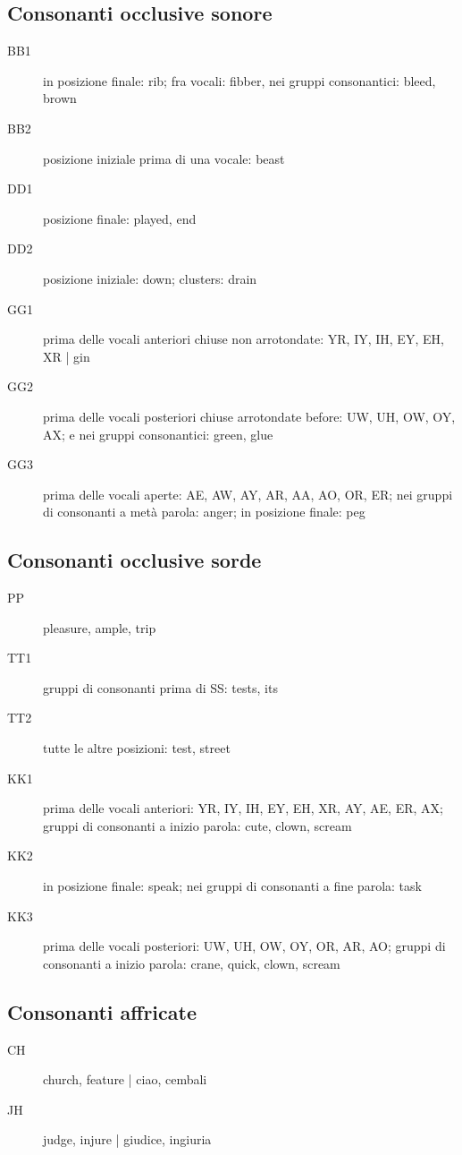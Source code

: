 \subsection{Consonanti occlusive sonore}
\begin{description}
\item[BB1] in posizione finale: rib; fra vocali: fibber, nei gruppi consonantici: bleed, brown
\item[BB2] posizione iniziale prima di una vocale: beast
\item[DD1] posizione finale: played, end
\item[DD2] posizione iniziale: down; clusters: drain
\item[GG1] prima delle vocali anteriori chiuse non arrotondate: YR, IY, IH, EY, EH, XR | gin
\item[GG2] prima delle vocali posteriori chiuse arrotondate before: UW, UH, OW, OY, AX; e nei gruppi consonantici: green, glue
\item[GG3] prima delle vocali aperte: AE, AW, AY, AR, AA, AO, OR, ER; nei gruppi di consonanti a metà parola: anger; in posizione finale: peg
\end{description}


\subsection{Consonanti occlusive sorde}
\begin{description}
\item[PP] pleasure, ample, trip
\item[TT1] gruppi di consonanti prima di SS: tests, its
\item[TT2] tutte le altre posizioni: test, street
\item[KK1] prima delle vocali anteriori: YR, IY, IH, EY, EH, XR, AY, AE, ER, AX; gruppi di consonanti a inizio parola: cute, clown, scream
\item[KK2] in posizione finale: speak; nei gruppi di consonanti a fine parola: task
\item[KK3] prima delle vocali posteriori: UW, UH, OW, OY, OR, AR, AO; gruppi di consonanti a inizio parola: crane, quick, clown, scream
\end{description}

\subsection{Consonanti affricate}
\begin{description}
\item[CH] church, feature | ciao, cembali
\item[JH] judge, injure | giudice, ingiuria
\end{description}

